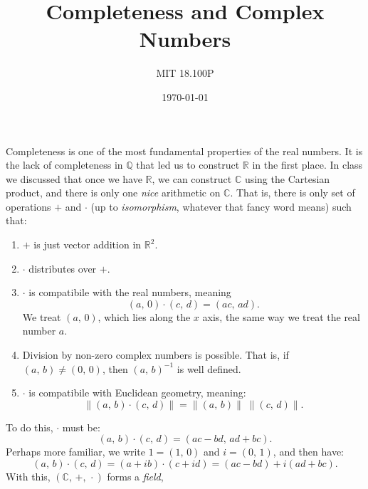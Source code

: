 \documentclass{article}
\title{Completeness and Complex Numbers}
\author{MIT 18.100P}
\date{\today}
\begin{document}
    \maketitle
    Completeness is one of the most fundamental properties of the real
    numbers. It is the lack of completeness in $\mathbb{Q}$ that led us to
    construct $\mathbb{R}$ in the first place. In class we discussed that once
    we have $\mathbb{R}$, we can construct $\mathbb{C}$ using the Cartesian
    product, and there is only one \textit{nice} arithmetic on $\mathbb{C}$.
    That is, there is only set of operations $+$ and $\cdot$
    (up to \textit{isomorphism}, whatever that fancy word means) such that:
    \begin{enumerate}
        \item
            $+$ is just vector addition in $\mathbb{R}^{2}$.
        \item
            $\cdot$ distributes over $+$.
        \item
            $\cdot$ is compatibile with the real numbers, meaning
            \begin{equation}
                (a,\,0)\cdot(c,\,d)
                =
                (ac,\,ad).
            \end{equation}
            We treat $(a,\,0)$, which lies
            along the $x$ axis, the same way we treat the real number $a$.
        \item
            Division by non-zero complex numbers is possible. That is,
            if $(a,\,b)\ne(0,\,0)$, then $(a,\,b)^{-1}$ is well defined.
        \item
            $\cdot$ is compatibile with Euclidean geometry, meaning:
            \begin{equation}
                \|(a,\,b)\cdot(c,\,d)\|
                =
                \|(a,\,b)\|
                \;
                \|(c,\,d)\|.
            \end{equation}
    \end{enumerate}
    To do this, $\cdot$ must be:
    \begin{equation}
        (a,\,b)\cdot(c,\,d)
        =
        (ac-bd,\,ad+bc).
    \end{equation}
    Perhaps more familiar, we write $1=(1,\,0)$ and $i=(0,\,1)$, and then have:
    \begin{equation}
        (a,\,b)\cdot(c,\,d)
        =
        (a+ib)\cdot(c+id)
        =
        (ac-bd)+i(ad+bc).
    \end{equation}
    With this, $(\mathbb{C},\,+,\,\cdot)$ forms a \textit{field},
\end{document}
